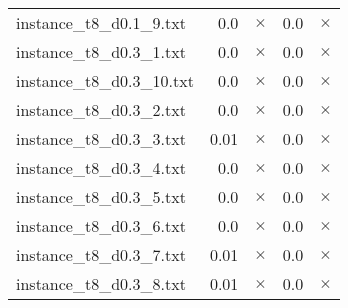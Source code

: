 \documentclass{article}
\begin{document}
\begin{center}
\begin{tabular}{lrrrr}
instance\_t8\_d0.1\_9.txt & 0.0 & 
$\times$
 & 0.0 & 
$\times$
\\
instance\_t8\_d0.3\_1.txt & 0.0 & 
$\times$
 & 0.0 & 
$\times$
\\
instance\_t8\_d0.3\_10.txt & 0.0 & 
$\times$
 & 0.0 & 
$\times$
\\
instance\_t8\_d0.3\_2.txt & 0.0 & 
$\times$
 & 0.0 & 
$\times$
\\
instance\_t8\_d0.3\_3.txt & 0.01 & 
$\times$
 & 0.0 & 
$\times$
\\
instance\_t8\_d0.3\_4.txt & 0.0 & 
$\times$
 & 0.0 & 
$\times$
\\
instance\_t8\_d0.3\_5.txt & 0.0 & 
$\times$
 & 0.0 & 
$\times$
\\
instance\_t8\_d0.3\_6.txt & 0.0 & 
$\times$
 & 0.0 & 
$\times$
\\
instance\_t8\_d0.3\_7.txt & 0.01 & 
$\times$
 & 0.0 & 
$\times$
\\
instance\_t8\_d0.3\_8.txt & 0.01 & 
$\times$
 & 0.0 & 
$\times$
\\
\hline\end{tabular}
\end{center}
\end{document}
